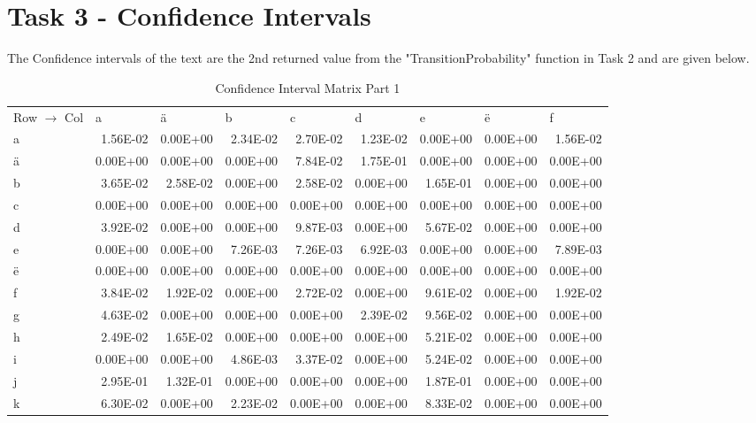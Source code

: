 \documentclass[11pt,a4paper]{CLabBookTemplate} %
\begin{document}
\section{Task 3 - Confidence Intervals}
The Confidence intervals of the text are the 2nd returned value from the "TransitionProbability" function in Task 2 and are given below. 
\begin{table}[htbp]
	\centering
	\caption{Confidence Interval Matrix Part 1}
	\begin{tabular}{lrrrrrrrr}
		Row $\rightarrow$ Col & \multicolumn{1}{l}{a} & \multicolumn{1}{l}{ä} & \multicolumn{1}{l}{b} & \multicolumn{1}{l}{c} & \multicolumn{1}{l}{d} & \multicolumn{1}{l}{e} & \multicolumn{1}{l}{ë} & \multicolumn{1}{l}{f} \\
		a     & 1.56E-02 & 0.00E+00 & 2.34E-02 & 2.70E-02 & 1.23E-02 & 0.00E+00 & 0.00E+00 & 1.56E-02 \\
		ä     & 0.00E+00 & 0.00E+00 & 0.00E+00 & 7.84E-02 & 1.75E-01 & 0.00E+00 & 0.00E+00 & 0.00E+00 \\
		b     & 3.65E-02 & 2.58E-02 & 0.00E+00 & 2.58E-02 & 0.00E+00 & 1.65E-01 & 0.00E+00 & 0.00E+00 \\
		c     & 0.00E+00 & 0.00E+00 & 0.00E+00 & 0.00E+00 & 0.00E+00 & 0.00E+00 & 0.00E+00 & 0.00E+00 \\
		d     & 3.92E-02 & 0.00E+00 & 0.00E+00 & 9.87E-03 & 0.00E+00 & 5.67E-02 & 0.00E+00 & 0.00E+00 \\
		e     & 0.00E+00 & 0.00E+00 & 7.26E-03 & 7.26E-03 & 6.92E-03 & 0.00E+00 & 0.00E+00 & 7.89E-03 \\
		ë     & 0.00E+00 & 0.00E+00 & 0.00E+00 & 0.00E+00 & 0.00E+00 & 0.00E+00 & 0.00E+00 & 0.00E+00 \\
		f     & 3.84E-02 & 1.92E-02 & 0.00E+00 & 2.72E-02 & 0.00E+00 & 9.61E-02 & 0.00E+00 & 1.92E-02 \\
		g     & 4.63E-02 & 0.00E+00 & 0.00E+00 & 0.00E+00 & 2.39E-02 & 9.56E-02 & 0.00E+00 & 0.00E+00 \\
		h     & 2.49E-02 & 1.65E-02 & 0.00E+00 & 0.00E+00 & 0.00E+00 & 5.21E-02 & 0.00E+00 & 0.00E+00 \\
		i     & 0.00E+00 & 0.00E+00 & 4.86E-03 & 3.37E-02 & 0.00E+00 & 5.24E-02 & 0.00E+00 & 0.00E+00 \\
		j     & 2.95E-01 & 1.32E-01 & 0.00E+00 & 0.00E+00 & 0.00E+00 & 1.87E-01 & 0.00E+00 & 0.00E+00 \\
		k     & 6.30E-02 & 0.00E+00 & 2.23E-02 & 0.00E+00 & 0.00E+00 & 8.33E-02 & 0.00E+00 & 0.00E+00 \\

\end{tabular}
\end{table}
\end{document}
